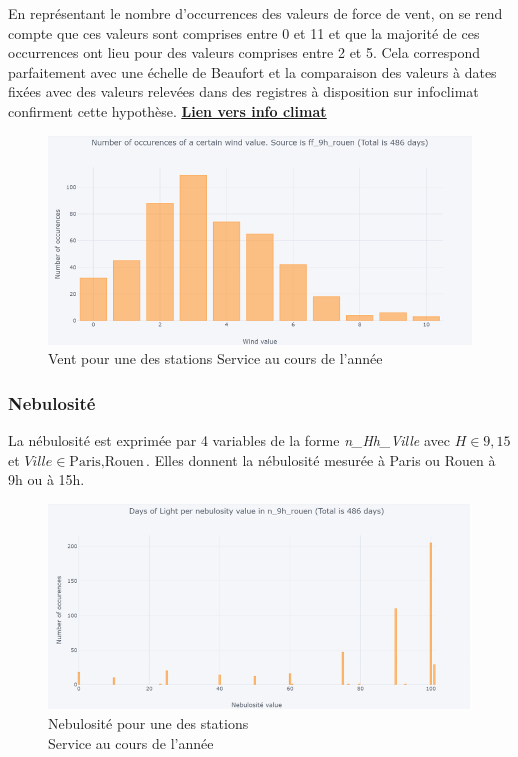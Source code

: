 \documentclass{article} %
\begin{document}
En représentant le nombre d’occurrences des valeurs de force de vent, on se rend compte que ces valeurs sont comprises entre 0 et 11 et que la majorité de ces occurrences ont lieu pour des valeurs comprises entre 2 et 5. Cela correspond parfaitement avec une échelle de Beaufort et la comparaison des valeurs à dates fixées avec des valeurs relevées dans des registres à disposition sur infoclimat confirment cette hypothèse.
\href{https://www.infoclimat.fr/observations-meteo/archives/27/janvier/2016/rouen-boos/07037.html}{\underline{\textbf{\textcolor[rgb]{0,0,1}{Lien vers info climat}}}}
\begin{figure}[!h]
	\centering
	\includegraphics[keepaspectratio = true,scale=0.55]{wind.png}
	\caption{Vent pour une des stations Service au cours de l'année}
	\label{fig:wind}
\end{figure}
\subsubsection{Nebulosité}


La nébulosité est exprimée par 4 variables de la forme \textit{n\_Hh\_Ville} avec $H \in {9,15}$ et $Ville \in {\mbox{Paris},\mbox{Rouen}}$. Elles donnent la nébulosité mesurée à Paris ou Rouen à 9h ou à 15h.\\
\begin{figure}
	\centering
	\includegraphics[keepaspectratio = true,scale=0.65]{neb.png}
	\caption[Nebulosité pour une des stations; Service au cours de l'année]{Nebulosité pour une des stations\\ Service au cours de l'année\endtabular}
	\label{fig:neb}
\end{figure}
~\\
\end{document}
